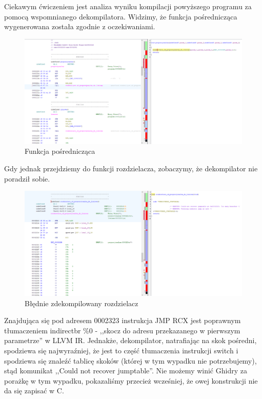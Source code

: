 Ciekawym ćwiczeniem jest analiza wyniku kompilacji powyższego programu za pomocą wspomnianego dekompilatora.
Widzimy, że funkcja pośrednicząca wygenerowana została zgodnie z oczekiwaniami.
\begin{figure}[H]
    \centering
    \includegraphics[width=1.2\textwidth]{images/2.rozdzielacz/1.png}
    \caption{Funkcja pośrednicząca}
\end{figure}
\FloatBarrier

Gdy jednak przejdziemy do funkcji rozdzielacza, zobaczymy, że dekompilator nie poradził sobie.
\begin{figure}[H]
    \centering
    \includegraphics[width=1.2\textwidth]{images/2.rozdzielacz/2.png}
    \caption{Błędnie zdekompilowany rozdzielacz}
\end{figure}

Znajdująca się pod adresem 0002323 instrukcja JMP RCX jest poprawnym tłumaczeniem indirectbr \%0 - ,,skocz do adresu przekazanego w pierwszym parametrze'' w LLVM IR. Jednakże, dekompilator, natrafiając na skok pośredni, spodziewa się najwyraźniej, że jest to część tłumaczenia instrukcji switch i spodziewa się znaleźć tablicę skoków (której w tym wypadku nie potrzebujemy), stąd komunikat ,,Could not recover jumptable''. Nie możemy winić Ghidry za porażkę w tym wypadku, pokazaliśmy przecież wcześniej, że owej konstrukcji nie da się zapisać w C.

